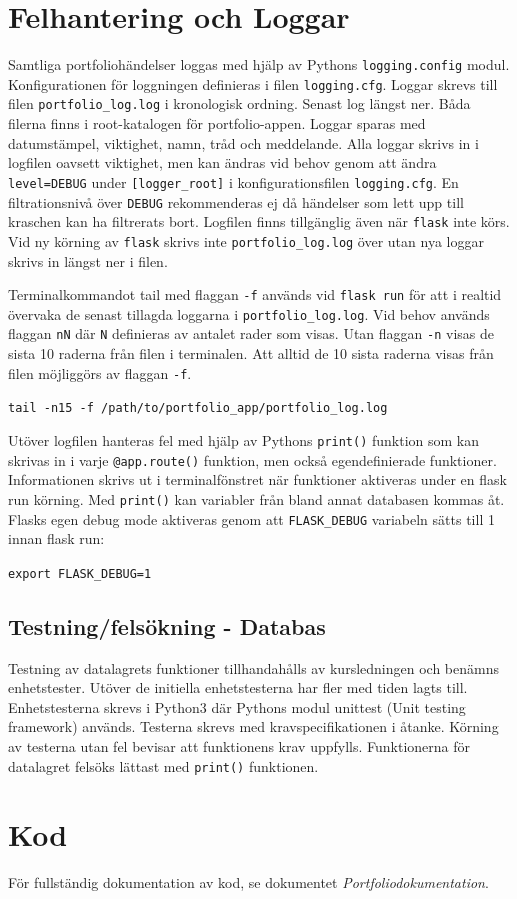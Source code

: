 \documentclass{TDP003mall}
\begin{document}
\section{Felhantering och Loggar}
Samtliga portfoliohändelser loggas med hjälp av Pythons \texttt{logging.config} modul. Konfigurationen för loggningen definieras i filen \texttt{logging.cfg}. Loggar skrevs till filen \texttt{portfolio\_log.log} i kronologisk ordning. Senast log längst ner. Båda filerna finns i root-katalogen för portfolio-appen. Loggar sparas med datumstämpel, viktighet, namn, tråd och meddelande. Alla loggar skrivs in i logfilen oavsett viktighet, men kan ändras vid behov genom att ändra \texttt{level=DEBUG} under \texttt{[logger\_root]} i konfigurationsfilen \texttt{logging.cfg}. En filtrationsnivå över \texttt{DEBUG} rekommenderas ej då händelser som lett upp till kraschen kan ha filtrerats bort. Logfilen finns tillgänglig även när \texttt{flask} inte körs. Vid ny körning av \texttt{flask} skrivs inte \texttt{portfolio\_log.log} över utan nya loggar skrivs in längst ner i filen.

Terminalkommandot tail med flaggan \texttt{-f} används vid \texttt{flask run} för att i realtid övervaka de senast tillagda loggarna i \texttt{portfolio\_log.log}. Vid behov används flaggan \texttt{nN} där \texttt{N} definieras av antalet rader som visas. Utan flaggan \texttt{-n} visas de sista 10 raderna från filen i terminalen. Att alltid de 10 sista raderna visas från filen möjliggörs av flaggan \texttt{-f}.

\texttt{tail -n15 -f /path/to/portfolio\_app/portfolio\_log.log}

Utöver logfilen hanteras fel med hjälp av Pythons \texttt{print()} funktion som kan skrivas in i varje \texttt{@app.route()} funktion, men också egendefinierade funktioner. Informationen skrivs ut i terminalfönstret när funktioner aktiveras under en flask run körning. Med \texttt{print()} kan variabler från bland annat databasen kommas åt. Flasks egen debug mode aktiveras genom att \texttt{FLASK\_DEBUG} variabeln sätts till 1 innan flask run:

\texttt{export FLASK\_DEBUG=1}

\subsection{Testning/felsökning - Databas}
Testning av datalagrets funktioner tillhandahålls av kursledningen och benämns enhetstester. Utöver de initiella enhetstesterna har fler med tiden lagts till. Enhetstesterna skrevs i Python3 där Pythons modul unittest (Unit testing framework) används. Testerna skrevs med kravspecifikationen i åtanke. Körning av testerna utan fel bevisar att funktionens krav uppfylls. Funktionerna för datalagret felsöks lättast med \texttt{print()} funktionen.

\section{Kod}
För fullständig dokumentation av kod, se dokumentet \textit{Portfoliodokumentation}.
\end{document}
